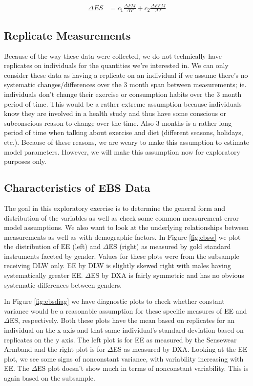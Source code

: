 \documentclass[11pt]{article}\usepackage[]{graphicx}\usepackage[]{color}
\begin{document}
\begin{align}
  \label{escalc}
  \Delta ES &= c_1 \frac{\Delta FM}{\Delta T} + c_2 \frac{\Delta FFM}{\Delta T}
\end{align}

\subsection{Replicate Measurements}

Because of the way these data were collected, we do not technically have replicates on individuals for the quantities we're interested in. We can only consider these data as having a replicate on an individual if we assume there's no systematic changes/differences over the 3 month span between measurements; ie. individuals don't change their exercise or consumption habits over the 3 month period of time. This would be a rather extreme assumption because individuals know they are involved in a health study and thus have some conscious or subconscious reason to change over the time. Also 3 months is a rather long period of time when talking about exercise and diet (different seasons, holidays, etc.). Because of these reasons, we are weary to make this assumption to estimate model parameters. However, we will make this assumption now for exploratory purposes only. 

\subsection{Characteristics of EBS Data}

The goal in this exploratory exercise is to determine the general form and distribution of the variables as well as check some common measurement error model assumptions. We also want to look at the underlying relationships between measurements as well as with demographic factors. In Figure \ref{fig:ebsw} we  plot the distribution of EE (left) and $\Delta$ES (right) as measured by gold standard instruments faceted by gender. Values for these plots were from the subsample receiving DLW only. EE by DLW is slightly skewed right with males having systematically greater EE. $\Delta$ES by DXA is fairly symmetric and has no obvious systematic differences between genders. 

In Figure \ref{fig:ebsdiag} we have diagnostic plots to check whether constant variance would be a reasonable assumption for these specific measures of EE and $\Delta$ES, respectively. Both these plots have the mean based on replicates for an individual on the x axis and that same individual's standard deviation based on replicates on the y axis. The left plot is for EE as measured by the Sensewear Armband and the right plot is for $\Delta$ES as measured by DXA. Looking at the EE plot, we see some signs of nonconstant variance, with variability increasing with EE. The $\Delta$ES plot doesn't show much in terms of nonconstant variability. This is again based on the subsample.
\end{document}
